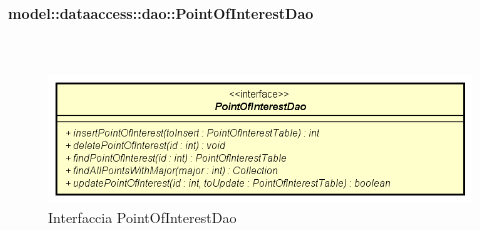 \documentclass[../DefinizioneDiProdotto.tex]{subfiles}
\begin{document}
\paragraph{model::dataaccess::dao::PointOfInterestDao}
\
\begin{figure}[H]
	\centering
	\includegraphics[width=\maxwidth]{img/PointOfInterestDao.png}
	\caption{Interfaccia PointOfInterestDao}\label{fig:model::dataaccess::dao::PointOfInterestDao} 
\end{figure}
\end{document}
